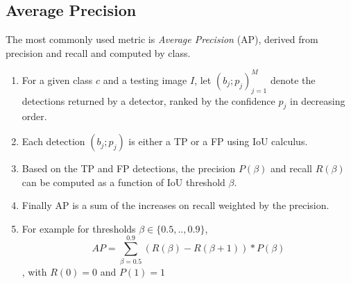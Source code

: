 \documentclass{beamer}
\begin{document}
\subsection{Average Precision}
\begin{frame}{}
	The most commonly used metric is \emph{Average Precision} (AP), derived from precision and recall and computed by class.
    \begin{enumerate}
        \item For a given class $c$ and a testing image $I$, let ${(b_{j} ; p_{j})}^M_{j=1}$ denote the detections returned by a detector, ranked by the confidence $p_{j}$ in decreasing order.
        \item Each detection $(b_{j} ; p_{j})$ is either a TP or a FP using IoU calculus.
        \item Based on the TP and FP detections, the precision $P(\beta)$ and recall $R(\beta)$ can be computed as a function of IoU threshold $\beta$.
        \item Finally AP is a sum of the increases on recall weighted by the precision.
        \item For example for thresholds $\beta \in \{0.5,..,0.9\}$,  $$AP = \sum_{\beta=0.5}^{0.9}(R(\beta) - R(\beta+1)) * P(\beta)$$, with $R(0) = 0$ and $P(1)=1$
    \end{enumerate}
\end{frame}
\end{document}
